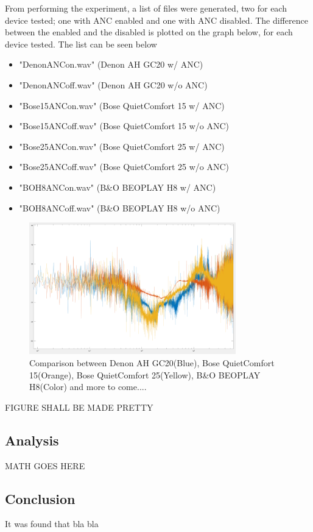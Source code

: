 From performing the experiment, a list of files were generated, two for each device tested; one with ANC enabled and one with ANC disabled.
The difference between the enabled and the disabled is plotted on the graph below, for each device tested. The list can be seen below

\begin{itemize}
	\item "DenonANCon.wav"		(Denon AH GC20 w/ ANC)
	\item "DenonANCoff.wav"		(Denon AH GC20 w/o ANC)
	\item "Bose15ANCon.wav"		(Bose QuietComfort 15 w/ ANC)
	\item "Bose15ANCoff.wav"	(Bose QuietComfort 15 w/o ANC)
	\item "Bose25ANCon.wav"		(Bose QuietComfort 25 w/ ANC)
	\item "Bose25ANCoff.wav"	(Bose QuietComfort 25 w/o ANC)
	\item "BOH8ANCon.wav"		(B\&O BEOPLAY H8 w/ ANC)
	\item "BOH8ANCoff.wav"		(B\&O BEOPLAY H8 w/o ANC)
\end{itemize}


\begin{figure}[H]
	\centering
	\includegraphics[width=0.8\textwidth]{../Journal/Experiments/TestofConsumerHeadphones/OtherBrandsComparison.png}
	\caption{Comparison between Denon AH GC20(Blue), Bose QuietComfort 15(Orange), Bose QuietComfort 25(Yellow), B\&O BEOPLAY H8(Color)  and more to come....}
	\label{OtherBrandsTest}
\end{figure}
FIGURE SHALL BE MADE PRETTY


\subsection{Analysis}
MATH GOES HERE



\subsection{Conclusion}
It was found that bla bla









